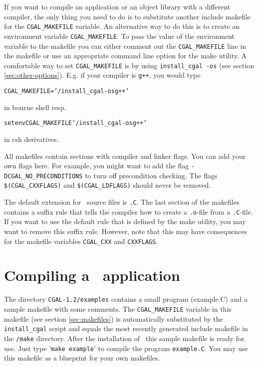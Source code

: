 If you want to compile an application or an object library with a
different compiler, the only thing you need to do is to substitute
another include makefile for the \texttt{CGAL\_MAKEFILE} variable. An
alternative way to do this is to create an environment variable
\texttt{CGAL\_MAKEFILE}. To pass the value of the environment variable
to the makefile you can either comment out the \texttt{CGAL\_MAKEFILE}
line in the makefile or use an appropriate command line option for
the make utility.
A comfortable way to set \texttt{CGAL\_MAKEFILE} is by using
\texttt{install\_cgal~-os} (see section \ref{sec:other-options}).
E.g. if your compiler is \texttt{g++}, you would type
\begin{alltt}
CGAL_MAKEFILE=`\yourcgaldir/install_cgal -os g++`
\end{alltt}
in bourne shell resp.
\begin{alltt}
setenv CGAL_MAKEFILE `\yourcgaldir/install_cgal -os g++`
\end{alltt}
in csh derivatives.

All makefiles contain sections with compiler and linker
flags.  You can add your own flags here. For example, you might want
to add the flag \texttt{-DCGAL\_NO\_PRECONDITIONS} to turn off
precondition checking. The flags \texttt{\$(CGAL\_CXXFLAGS)} and
\texttt{\$(CGAL\_LDFLAGS)} should never be removed.

The default extension for \cgal\ source files is \texttt{.C}.  The
last section of the makefiles contains a suffix rule that tells the
compiler how to create a \texttt{.o}-file from a \texttt{.C}-file.  If
you want to use the default rule that is defined by the make utility,
you may want to remove this suffix rule.  However, note that this may
have consequences for the makefile variables \texttt{CGAL\_CXX} and
\texttt{CXXFLAGS}.

\section{Compiling a \cgal\ application}
The directory \texttt{CGAL-1.2/examples} contains a small program
(example.C) and a sample makefile with some comments. The
\texttt{CGAL\_MAKEFILE} variable in this makefile (see section
\ref{sec:makefiles}) is automatically substituted by the
\texttt{install\_cgal} script and equals the most recently generated
include makefile in the \texttt{\cgaldir/make} directory. After the
installation of \cgal\ this sample makefile is ready for use. Just
type '\texttt{make example}' to compile the program
\texttt{example.C}.  You may use this makefile as a blueprint for your
own makefiles.

